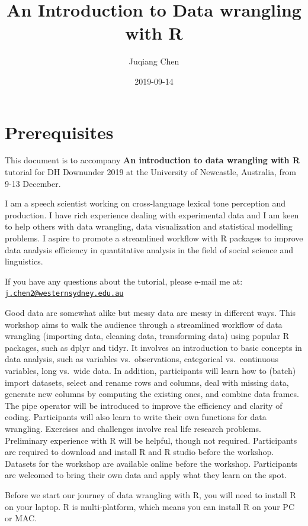 \documentclass[]{book}
\title{An Introduction to Data wrangling with R}
\author{Juqiang Chen}
\date{2019-09-14}
\begin{document}
\maketitle

{
\setcounter{tocdepth}{1}
\tableofcontents
}
\chapter{Prerequisites}\label{prerequisites}

This document is to accompany \textbf{An introduction to data wrangling
with R} tutorial for DH Downunder 2019 at the University of Newcastle,
Australia, from 9-13 December.

I am a speech scientist working on cross-language lexical tone
perception and production. I have rich experience dealing with
experimental data and I am keen to help others with data wrangling, data
visualization and statistical modelling problems. I aspire to promote a
streamlined workflow with R packages to improve data analysis efficiency
in quantitative analysis in the field of social science and linguistics.

If you have any questions about the tutorial, please e-mail me at:
\href{mailto:j.chen2@westernsydney.edu.au}{\nolinkurl{j.chen2@westernsydney.edu.au}}

Good data are somewhat alike but messy data are messy in different ways.
This workshop aims to walk the audience through a streamlined workflow
of data wrangling (importing data, cleaning data, transforming data)
using popular R packages, such as dplyr and tidyr. It involves an
introduction to basic concepts in data analysis, such as variables
vs.~observations, categorical vs.~continuous variables, long vs.~wide
data. In addition, participants will learn how to (batch) import
datasets, select and rename rows and columns, deal with missing data,
generate new columns by computing the existing ones, and combine data
frames. The pipe operator will be introduced to improve the efficiency
and clarity of coding. Participants will also learn to write their own
functions for data wrangling. Exercises and challenges involve real life
research problems. Preliminary experience with R will be helpful, though
not required. Participants are required to download and install R and R
studio before the workshop. Datasets for the workshop are available
online before the workshop. Participants are welcomed to bring their own
data and apply what they learn on the spot.

Before we start our journey of data wrangling with R, you will need to
install R on your laptop. R is multi-platform, which means you can
install R on your PC or MAC.
\end{document}

